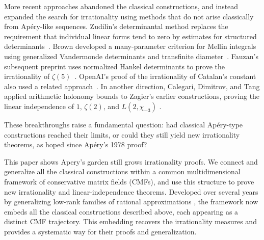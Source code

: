 \documentclass[oneside,english,11pt]{amsart}
\begin{document}
More recent approaches abandoned the classical constructions, and instead expanded the search for irrationality using methods that do not arise classically from Ap\'ery-like sequences. 
Zudilin's determinantal method replaces the requirement that individual linear forms tend to zero by estimates for structured determinants~\cite{zudilin2017determinantal}. 
Brown developed a many-parameter criterion for Mellin integrals using generalized Vandermonde determinants and transfinite diameter~\cite{brown2026mellin}. 
Fauzan's subsequent preprint uses normalized Hankel determinants to prove the irrationality of $\zeta(5)$~\cite{fauzan2026}.
OpenAI's proof of the irrationality of Catalan's constant also used a related approach~\cite{openai2026catalan}.
In another direction, Calegari, Dimitrov, and Tang applied arithmetic holonomy bounds to Zagier's earlier constructions, proving the linear independence of $1$, $\zeta(2)$, and $L(2,\chi_{-3})$ \cite{zagier2009apery,calegari2024linear,calegariDimitrovTang2025Holonomy}.

These breakthroughs raise a fundamental question: had classical Ap\'ery-type constructions reached their limits, or could they still yield new irrationality theorems, as hoped since Ap\'ery's 1978 proof?

%


This paper shows Apery's garden still grows irrationality proofs.
We connect and generalize all the classical constructions within a common multidimensional framework of conservative matrix fields (CMFs), and use this structure to prove new irrationality and linear-independence theorems. 
Developed over several years by generalizing low-rank families of rational approximations \cite{elimelech2024algorithm,weinbaum2025conservative,raz2025euler}, the framework now embeds all the classical constructions described above, each appearing as a distinct CMF trajectory. This embedding recovers the irrationality measures and provides a systematic way for their proofs and generalization.


%
%
%
%
%
%
\end{document}
